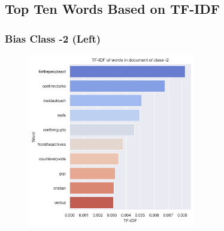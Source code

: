 \documentclass[11pt]{article}
\begin{document}
\pagebreak

\subsection{Top Ten Words Based on TF-IDF}
\subsubsection{Bias Class -2 (Left)}
\begin{center}


\TTTFIDFTable
\begin{figure}[h!]
  \includegraphics[width=0.65\textwidth]{figs/top_ten_tf_idf/tf_idf_word_-2.png}
\end{figure}
\end{center}

\pagebreak
\end{document}
